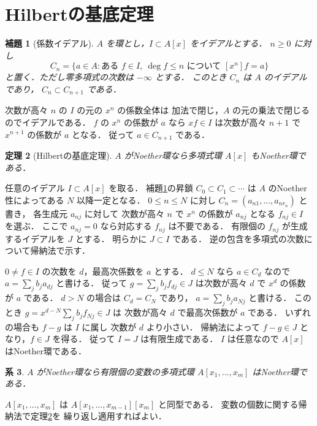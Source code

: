 \documentclass[a5paper,10pt,onecolumn]{jsarticle}
\makeatletter
\theoremstyle{mathnotetheorem}
\newtheorem{theorem}{定理}[section]
\newtheorem{lemma}[theorem]{補題}
\newtheorem{corollary}[theorem]{系}
\renewcommand{\proofname}{証明}
\renewenvironment{proof}[1][\proofname]{%
  \par\pushQED{\qed}\normalfont\topsep4\p@\@plus2\p@\relax
  \trivlist\item[\hskip\labelsep\bfseries #1]\ignorespaces
}{\popQED\endtrivlist\@endpefalse}
\makeatother
\begin{document}
\section{Hilbertの基底定理}
\begin{lemma}[係数イデアル]\label{lem:coeff}
$A$ を環とし，$I\subset A[x]$ をイデアルとする．
$n\ge0$ に対し
\[
 C_n=\{a\in A:\text{ある }f\in I,\ \deg f\le n
 \text{ について }[x^n]f=a\}
\]
と置く．ただし零多項式の次数は $-\infty$ とする．
このとき $C_n$ は $A$ のイデアルであり，
$C_n\subset C_{n+1}$ である．
\end{lemma}
\begin{proof}
次数が高々 $n$ の $I$ の元の $x^n$ の係数全体は
加法で閉じ，$A$ の元の乗法で閉じるのでイデアルである．
$f$ の $x^n$ の係数が $a$ なら
$xf\in I$ は次数が高々 $n+1$ で
$x^{n+1}$ の係数が $a$ となる．
従って $a\in C_{n+1}$ である．
\end{proof}
\begin{theorem}[Hilbertの基底定理]\label{thm:hilbert}
$A$ がNoether環なら多項式環 $A[x]$ もNoether環である．
\end{theorem}
\begin{proof}
任意のイデアル $I\subset A[x]$ を取る．
補題\ref{lem:coeff}の昇鎖 $C_0\subset C_1\subset\cdots$ は
$A$ のNoether性によってある $N$ 以降一定となる．
$0\le n\le N$ に対し
$C_n=(a_{n1},\ldots,a_{nr_n})$ と書き，
各生成元 $a_{nj}$ に対して
次数が高々 $n$ で $x^n$ の係数が $a_{nj}$
となる $f_{nj}\in I$ を選ぶ．
ここで $a_{nj}=0$ なら対応する $f_{nj}$ は不要である．
有限個の $f_{nj}$ が生成するイデアルを $J$ とする．
明らかに $J\subset I$ である．
逆の包含を多項式の次数について帰納法で示す．

$0\ne f\in I$ の次数を $d$，最高次係数を $a$ とする．
$d\le N$ なら $a\in C_d$ なので
$a=\sum_j b_ja_{dj}$ と書ける．
従って
$g=\sum_jb_jf_{dj}\in J$ は次数が高々 $d$ で
$x^d$ の係数が $a$ である．
$d>N$ の場合は $C_d=C_N$ であり，
$a=\sum_jb_ja_{Nj}$ と書ける．
このとき
$g=x^{d-N}\sum_jb_jf_{Nj}\in J$ は
次数が高々 $d$ で最高次係数が $a$ である．
いずれの場合も $f-g$ は $I$ に属し
次数が $d$ より小さい．
帰納法によって $f-g\in J$ となり，$f\in J$ を得る．
従って $I=J$ は有限生成である．
$I$ は任意なので $A[x]$ はNoether環である．
\end{proof}
\begin{corollary}
$A$ がNoether環なら有限個の変数の多項式環
$A[x_1,\ldots,x_m]$ はNoether環である．
\end{corollary}
\begin{proof}
$A[x_1,\ldots,x_m]$ は
$A[x_1,\ldots,x_{m-1}][x_m]$ と同型である．
変数の個数に関する帰納法で定理\ref{thm:hilbert}を
繰り返し適用すればよい．
\end{proof}
\end{document}
